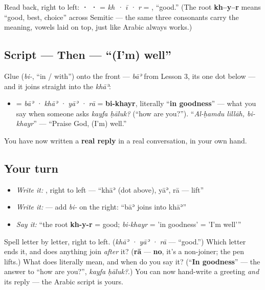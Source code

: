 Read back, right to left: \textbf{ ·  · } = \emph{kh · ī · r} = \textbf{}, \textquotedblleft{}good.\textquotedblright{} (The root \textbf{kh–y–r} means \textquotedblleft{}good, best, choice\textquotedblright{} across Semitic — the same three consonants carry the meaning, vowels laid on top, just like Arabic always works.)

\subsection*{Script — Then  — \textquotedblleft{}(I'm) well\textquotedblright{}}
Glue \textbf{} (\emph{bi-}, \textquotedblleft{}in / with\textquotedblright{}) onto the front — \emph{bāʾ} from Lesson 3, its one dot below — and it joins straight into the \emph{khāʾ}:

\begin{itemize}
\raggedright
  \item \textbf{} = \emph{bāʾ · khāʾ · yāʾ · rā} = \textbf{bi-khayr}, literally \textquotedblleft{}\textbf{in goodness}\textquotedblright{} — what you say when someone asks \emph{kayfa ḥāluk?} (\textquotedblleft{}how are you?\textquotedblright{}). \textquotedblleft{}\emph{Al-ḥamdu lillāh, bi-khayr}\textquotedblright{} — \textquotedblleft{}Praise God, (I'm) well.\textquotedblright{}
\end{itemize}

You have now written a \textbf{real reply} in a real conversation, in your own hand.

\subsection*{Your turn}
\begin{itemize}
\raggedright
  \item \emph{Write it:} \textbf{}, right to left — \textquotedblleft{}khāʾ (dot above), yāʾ, rā — lift\textquotedblright{}
  \item \emph{Write it:} \textbf{} — add \emph{bi-} on the right: \textquotedblleft{}bāʾ joins into khāʾ\textquotedblright{}
  \item \emph{Say it:} \textquotedblleft{}the root \textbf{kh-y-r} = good; \emph{bi-khayr} = 'in goodness' = 'I'm well'\textquotedblright{}
\end{itemize}

\begin{tcolorbox}[breakable,colback=teal!4,colframe=teal!35!black,title={Before you move on}]
Spell \textbf{} letter by letter, right to left. (\emph{khāʾ · yāʾ · rā} — \textquotedblleft{}good.\textquotedblright{}) Which letter ends it, and does anything join \emph{after} it? (\textbf{rā} — \textbf{no}, it's a non-joiner; the pen lifts.) What does \textbf{} literally mean, and when do you say it? (\textquotedblleft{}\textbf{In goodness}\textquotedblright{} — the answer to \textquotedblleft{}how are you?\textquotedblright{}, \emph{kayfa ḥāluk?}.) You can now hand-write a greeting \emph{and} its reply — the Arabic script is yours.
\end{tcolorbox}
